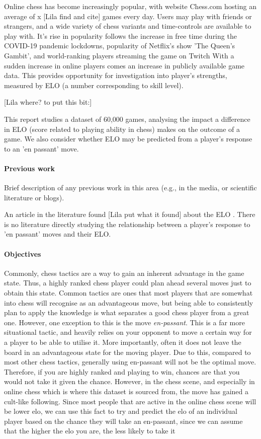 \documentclass[11pt,a4paper]{article}
\begin{document}
Online chess has become increasingly popular, with website Chess.com hosting an average of x [Lila find and cite] games every day. Users may play with friends or strangers, and a wide variety of chess variants and time-controls are available to play with. It's rise in popularity follows the increase in free time during the COVID-19 pandemic lockdowns, popularity of Netflix's show 'The Queen's Gambit', and world-ranking players streaming the game on Twitch \cite{The2020ChessBoom} With a sudden increase in online players comes an increase in publicly available game data. This provides opportunity for investigation into player's strengths, measured by ELO (a number corresponding to skill level).

[Lila where? to put this bit:]

This report studies a dataset of 60,000 games, analysing the impact a difference in ELO (score related to playing ability in chess) makes on the outcome of a game. We also consider whether ELO may be predicted from a player's response to an 'en passant' move.

\paragraph{Previous work}

Brief description of any previous work in this area (e.g., in the
media, or scientific literature or blogs).

An article in the literature found [Lila put what it found] about the ELO \cite{HowMuchDoesEloMatter}.
There is no literature directly studying the relationship between a player's response to 'en passant' moves and their ELO.
\paragraph{Objectives}

Commonly, chess tactics are a way to gain an inherent advantage in the game state. Thus, a highly ranked chess player could plan ahead several moves just to obtain this state. Common tactics are ones that most players that are somewhat into chess will recognise as an advantageous move, but being able to consistently plan to apply the knowledge is what separates a good chess player from a great one. However, one exception to this is the move \textit{en-passant}. This is a far more situational tactic, and heavily relies on your opponent to move a certain way for a player to be able to utilise it. More importantly, often it does not leave the board in an advantageous state for the moving player. Due to this, compared to most other chess tactics, generally using en-passant will not be the optimal move. Therefore, if you are highly ranked and playing to win, chances are that you would not take it given the chance. However, in the chess scene, and especially in online chess which is where this dataset is sourced from, the move has gained a cult-like following. Since most people that are active in the online chess scene will be lower elo, we can use this fact to try and predict the elo of an individual player based on the chance they will take an en-passant, since we can assume that the higher the elo you are, the less likely to take it
\end{document}
